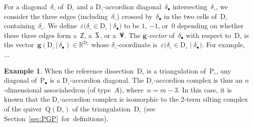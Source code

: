 \documentclass{amsart}
\theoremstyle{definition}
\newtheorem{example}[theorem]{Example}
\newcommand{\R}{\mathbb{R}} %
\renewcommand{\b}[1]{\mathbf{#1}} %
\newcommand{\bigset}[2]{\big\{ #1 \;\big|\; #2 \big\}} %
\newcommand{\eqdef}{\mbox{\,\raisebox{0.2ex}{\scriptsize\ensuremath{\mathrm:}}\ensuremath{=}\,}} %
\newcommand{\darkblue}{\color{darkblue}} %
\newcommand{\defn}[1]{\textsl{\darkblue #1}} %
\newcommand{\vincent}[1]{\todo[color=blue!30]{#1 \\ \hfill --- V.}}
\newcommand{\polygon}{\mathrm{P}} %
\newcommand{\dissection}{\mathrm{D}} %
\newcommand{\sign}[3]{\varepsilon \big( {#1} \in {#2}\;|\;{#3} \big)} %
\newcommand{\SSS}{\reflectbox{$\mathsf{Z}$}} %
\newcommand{\ZZZ}{\mathsf{Z}} %
\newcommand{\VVV}{{\mathsf{{V \hspace{-.1686cm} I\,}}}} %
\newcommand{\gvector}[2]{\mathbf{g}(#1 \,|\, #2)} %
\newcommand{\biggvectors}[2]{\mathbf{g} \big( #1 \,|\, #2 \big)} %
\newcommand{\gvectorFan}{\mathcal{F}^\mathbf{g}} %
\newcommand{\quiver}{\mathrm{Q}} %
\begin{document}


For a diagonal~$\delta_\circ$ of~$\dissection_\circ$ and a $\dissection_\circ$-accordion diagonal~$\delta_\bullet$ intersecting~$\delta_\circ$, we consider the three edges (including~$\delta_\circ$) crossed by~$\delta_\bullet$ in the two cells of~$\dissection_\circ$ containing~$\delta_\circ$. We define~$\sign{\delta_\circ}{\dissection_\circ}{\delta_\bullet}$ to be $1$, $-1$, or~$0$ depending on whether these three edges form a~$\ZZZ$, a~$\SSS$, or a~$\VVV$.
The \defn{$\b{g}$-vector} of~$\delta_\bullet$ with respect to~$\dissection_\circ$ is the vector~$\gvector{\dissection_\circ}{\delta_\bullet} \in \R^{\dissection_\circ}$ whose $\delta_\circ$-coordinate is~$\sign{\delta_\circ}{\dissection_\circ}{\delta_\bullet}$.
For example, ...
\vincent{Do example}

\begin{example}
\label{exm:associahedron}
When the reference dissection~$\dissection_\circ$ is a triangulation of~$\polygon_\circ$, any diagonal of~$\polygon_\bullet$ is a $\dissection_\circ$-accordion diagonal.
The $\dissection_\circ$-accordion complex is thus an $n$-dimensional associahedron (of type~$A$), where~$n = m-3$.
In this case, it is known that the $\dissection_\circ$-accordion complex is isomorphic to the $2$-term silting complex of the quiver~$\quiver(\dissection_\circ)$ of the triangulation~$\dissection_\circ$ (see Section~\ref{sec:PGP}~for~definitions).
\end{example}
\end{document}
